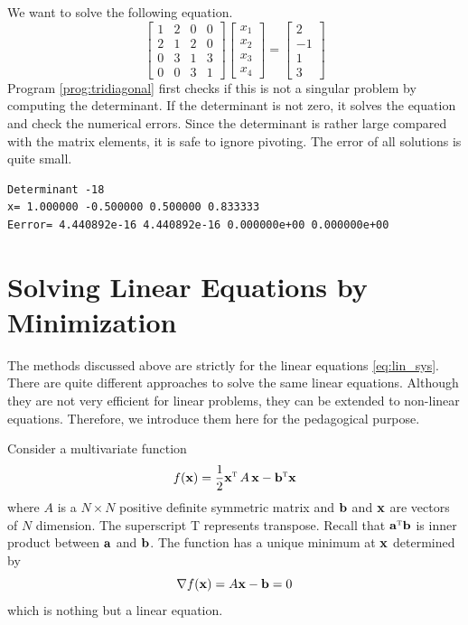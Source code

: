 \begin{example}
We want to solve the following equation.
\begin{equation}
\begin{bmatrix}
1 & 2 & 0 & 0 \\
2 & 1 & 2 & 0 \\
0 & 3 & 1 & 3 \\
0 & 0 & 3 & 1
\end{bmatrix}
\begin{bmatrix}
x_1 \\ x_2 \\ x_3 \\ x_4
\end{bmatrix}
=
\begin{bmatrix}
2 \\ -1 \\ 1 \\ 3
\end{bmatrix}
\end{equation}
Program \ref{prog:tridiagonal} first checks if this is not a singular problem by computing the determinant. If the determinant is not zero, it solves the equation and check the numerical errors. Since the determinant is rather large compared with the matrix elements, it is safe to ignore pivoting. The error of all solutions is quite small.

\begin{mybox}

\small
\begin{verbatim}
Determinant -18
x= 1.000000 -0.500000 0.500000 0.833333
Eerror= 4.440892e-16 4.440892e-16 0.000000e+00 0.000000e+00
\end{verbatim}
\normalsize
\end{mybox}
\end{example}



\noindent
\section{Solving Linear Equations by Minimization}

The methods discussed above are strictly for the linear equations \eqref{eq:lin_sys}.
There are quite different approaches to solve the same linear equations.  Although they are not very efficient for linear problems, they can be extended to non-linear equations.  Therefore, we introduce them here for the pedagogical purpose.

Consider a multivariate function
\begin{equation}\label{eq:cost_quadratic}
f(\vb{x}) = \frac{1}{2} \vb{x}^\textsc{t}\, A\, \vb{x} - \vb{b}^\textsc{t} \vb{x}
\end{equation}
where $A$ is a $N \times N$ positive definite symmetric matrix and $\vb{b}$ and $\vb{x}$ are vectors of $N$ dimension.
The superscript T represents transpose.  Recall that $\vb{a}^\textsc{t} \vb{b}$ is inner product between $\vb{a}$ and $\vb{b}$.  The function has a unique minimum at $\vb{x}$ determined by
\begin{equation}\label{eq:lin_sys_min}
\nabla f(\vb{x}) = A \vb{x} - \vb{b}=0
\end{equation} 
which is nothing but a linear equation.  

